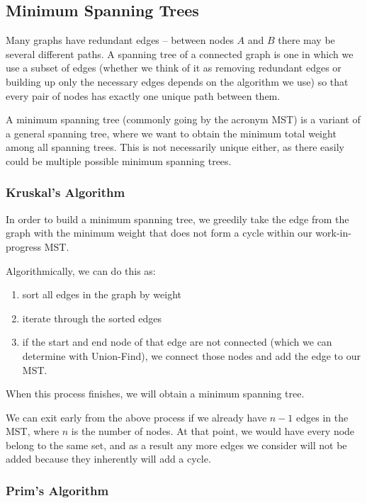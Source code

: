 \subsection{Minimum Spanning Trees}
 

Many graphs have redundant edges -- between nodes $A$ and $B$ there may be several different paths. A spanning tree of a connected graph is one in which we use a subset of edges (whether we think of it as removing redundant edges or building up only the necessary edges depends on the algorithm we use) so that every pair of nodes has exactly one unique path between them.

A minimum spanning tree (commonly going by the acronym MST) is a variant of a general spanning tree, where we want to obtain the minimum total weight among all spanning trees. This is not necessarily unique either, as there easily could be multiple possible minimum spanning trees.

\subsubsection{Kruskal's Algorithm}

In order to build a minimum spanning tree, we greedily take the edge from the graph with the minimum weight that does not form a cycle within our work-in-progress MST.

Algorithmically, we can do this as:
\begin{enumerate}
\item sort all edges in the graph by weight
\item iterate through the sorted edges
\item if the start and end node of that edge are not connected (which we can determine with Union-Find), we connect those nodes and add the edge to our MST.
\end{enumerate}
When this process finishes, we will obtain a minimum spanning tree.

We can exit early from the above process if we already have $n-1$ edges in the MST, where $n$ is the number of nodes. At that point, we would have every node belong to the same set, and as a result any more edges we consider will not be added because they inherently will add a cycle.

\subsubsection{Prim's Algorithm}

